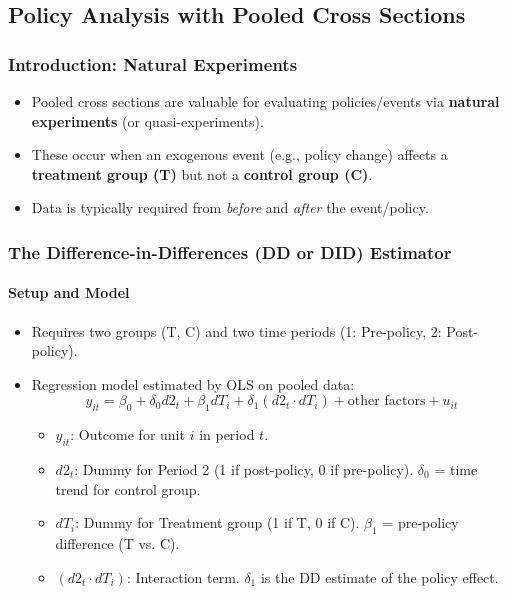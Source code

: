 \documentclass[a4paper, 10pt]{article}
\theoremstyle{definition}	%
\begin{document}
\subsection{Policy Analysis with Pooled Cross Sections}

\subsubsection{Introduction: Natural Experiments} %
\begin{itemize}
    \item Pooled cross sections are valuable for evaluating policies/events via \textbf{natural experiments} (or quasi-experiments).
    \item These occur when an exogenous event (e.g., policy change) affects a \textbf{treatment group (T)} but not a \textbf{control group (C)}.
    \item Data is typically required from \textit{before} and \textit{after} the event/policy.
\end{itemize}

\subsubsection{The Difference-in-Differences (DD or DID) Estimator} %
\paragraph{Setup and Model} %
\begin{itemize}
    \item Requires two groups (T, C) and two time periods (1: Pre-policy, 2: Post-policy).
    \item Regression model estimated by OLS on pooled data:
    \[ y_{it} = \beta_0 + \delta_0 d2_t + \beta_1 dT_i + \delta_1 (d2_t \cdot dT_i) + \text{other factors} + u_{it} \]
    \begin{itemize}
        \item \(y_{it}\): Outcome for unit \(i\) in period \(t\).
        \item \(d2_t\): Dummy for Period 2 (1 if post-policy, 0 if pre-policy). \(\delta_0\) = time trend for control group.
        \item \(dT_i\): Dummy for Treatment group (1 if T, 0 if C). \(\beta_1\) = pre-policy difference (T vs. C).
        \item \((d2_t \cdot dT_i)\): Interaction term. \(\delta_1\) is the DD estimate of the policy effect.
    \end{itemize}
\end{itemize}
\end{document}
